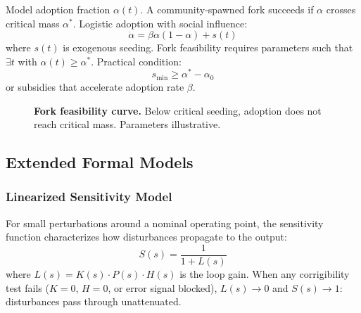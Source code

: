 \documentclass{article}
\begin{document}
Model adoption fraction $\alpha(t)$. A community-spawned fork succeeds if $\alpha$ crosses critical mass $\alpha^*$. Logistic adoption with social influence:
\begin{equation}
\dot{\alpha} = \beta \alpha(1 - \alpha) + s(t)
\end{equation}
where $s(t)$ is exogenous seeding. Fork feasibility requires parameters such that $\exists t$ with $\alpha(t) \geq \alpha^*$. Practical condition:
\begin{equation}
s_{\min} \geq \alpha^* - \alpha_0
\end{equation}
or subsidies that accelerate adoption rate $\beta$.

\begin{figure}[htbp]
\centering
{}
\caption{\textbf{Fork feasibility curve.} Below critical seeding, adoption does not reach critical mass. Parameters illustrative.}
\label{fig:fork-feasibility}
\end{figure}

\subsection{Extended Formal Models}

\subsubsection{Linearized Sensitivity Model}

For small perturbations around a nominal operating point, the sensitivity function characterizes how disturbances propagate to the output:
\begin{equation}
S(s) = \frac{1}{1 + L(s)}
\end{equation}
where $L(s) = K(s) \cdot P(s) \cdot H(s)$ is the loop gain. When any corrigibility test fails ($K=0$, $H=0$, or error signal blocked), $L(s) \to 0$ and $S(s) \to 1$: disturbances pass through unattenuated.
\end{document}

